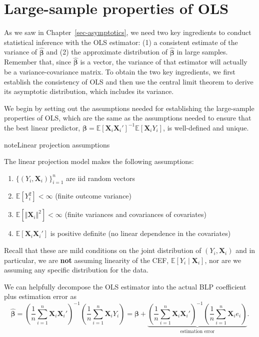 \documentclass[
  13pt,
  letterpaper,
  DIV=11,
  numbers=noendperiod]{scrreprt}
\newcommand{\mb}{\bm}
\newcommand{\E}{\mathbb{E}}
\newcommand{\X}{\mb{X}}
\newcommand{\bfbeta}{\mb{\beta}}
\newcommand{\bhat}{\widehat{\mb{\beta}}}
\theoremstyle{plain}
\theoremstyle{plain}
\theoremstyle{definition}
\theoremstyle{definition}
\theoremstyle{remark}
\begin{document}
\section{Large-sample properties of
OLS}\label{large-sample-properties-of-ols}

As we saw in Chapter~\ref{sec-asymptotics}, we need two key ingredients
to conduct statistical inference with the OLS estimator: (1) a
consistent estimate of the variance of \(\bhat\) and (2) the approximate
distribution of \(\bhat\) in large samples. Remember that, since
\(\bhat\) is a vector, the variance of that estimator will actually be a
variance-covariance matrix. To obtain the two key ingredients, we first
establish the consistency of OLS and then use the central limit theorem
to derive its asymptotic distribution, which includes its variance.

We begin by setting out the assumptions needed for establishing the
large-sample properties of OLS, which are the same as the assumptions
needed to ensure that the best linear predictor,
\(\bfbeta = \E[\X_{i}\X_{i}']^{-1}\E[\X_{i}Y_{i}]\), is well-defined and
unique.

\begin{bookcallout}{note}{Linear projection assumptions}

The linear projection model makes the following assumptions:

\begin{enumerate}
\def\labelenumi{\arabic{enumi}.}
\item
  \(\{(Y_{i}, \X_{i})\}_{i=1}^n\) are iid random vectors
\item
  \(\E[Y^{2}_{i}] < \infty\) (finite outcome variance)
\item
  \(\E[\Vert \X_{i}\Vert^{2}] < \infty\) (finite variances and
  covariances of covariates)
\item
  \(\E[\X_{i}\X_{i}']\) is positive definite (no linear dependence in
  the covariates)
\end{enumerate}

\end{bookcallout}

Recall that these are mild conditions on the joint distribution of
\((Y_{i}, \X_{i})\) and in particular, we are \textbf{not} assuming
linearity of the CEF, \(\E[Y_{i} \mid \X_{i}]\), nor are we assuming any
specific distribution for the data.

We can helpfully decompose the OLS estimator into the actual BLP
coefficient plus estimation error as \[ 
\bhat = \left( \frac{1}{n} \sum_{i=1}^n \X_i\X_i' \right)^{-1} \left( \frac{1}{n} \sum_{i=1}^n \X_iY_i \right) = \bfbeta + \underbrace{\left( \frac{1}{n} \sum_{i=1}^n \X_i\X_i' \right)^{-1} \left( \frac{1}{n} \sum_{i=1}^n \X_ie_i \right)}_{\text{estimation error}}.
\]
\end{document}
